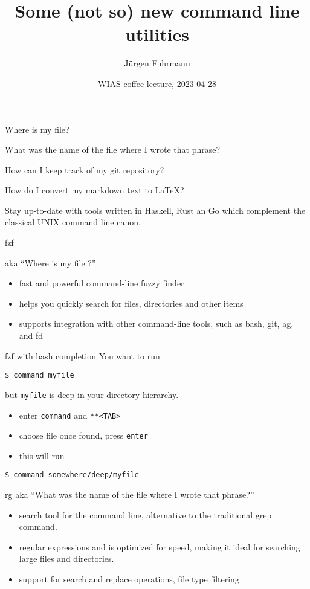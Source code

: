 \documentclass[
  10pt,
  ignorenonframetext,
]{beamer}
\title{Some (not so) new command line utilities}
\author{Jürgen Fuhrmann}
\date{WIAS coffee lecture, 2023-04-28}
\providecommand{\tightlist}{%
  \setlength{\itemsep}{0pt}\setlength{\parskip}{0pt}}
\begin{document}
\frame{\titlepage}

\begin{frame}
Where is my file?

What was the name of the file where I wrote that phrase?

How can I keep track of my git repository?

How do I convert my markdown text to LaTeX?

Stay up-to-date with tools written in Haskell, Rust an Go which
complement the classical UNIX command line canon.
\end{frame}

\begin{frame}{fzf}
\protect\hypertarget{fzf}{}
\begin{block}{aka ``Where is my file ?''}
\protect\hypertarget{aka-where-is-my-file}{}
\begin{itemize}
\tightlist
\item
  fast and powerful command-line fuzzy finder
\item
  helps you quickly search for files, directories and other items
\item
  supports integration with other command-line tools, such as bash, git,
  ag, and fd
\end{itemize}
\end{block}
\end{frame}

\begin{frame}[fragile]{fzf with bash completion}
\protect\hypertarget{fzf-with-bash-completion}{}
You want to run

\begin{verbatim}
$ command myfile
\end{verbatim}

but \texttt{myfile} is deep in your directory hierarchy.

\begin{itemize}
\tightlist
\item
  enter \texttt{command} and \texttt{**\textless{}TAB\textgreater{}}
\item
  choose file once found, press \texttt{enter}
\item
  this will run
\end{itemize}

\begin{verbatim}
$ command somewhere/deep/myfile
\end{verbatim}
\end{frame}

\begin{frame}{rg}
\protect\hypertarget{rg}{}
aka ``What was the name of the file where I wrote that phrase?''

\begin{itemize}
\tightlist
\item
  search tool for the command line, alternative to the traditional grep
  command.
\item
  regular expressions and is optimized for speed, making it ideal for
  searching large files and directories.
\item
  support for search and replace operations, file type filtering
\end{itemize}
\end{frame}
\end{document}
